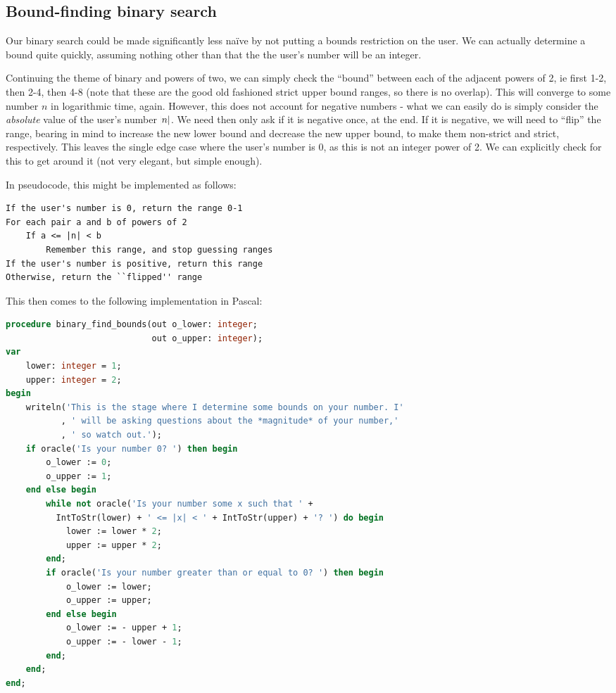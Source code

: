 \documentclass{article}
\begin{document}
    \subsection{Bound-finding binary search}

    Our binary search could be made significantly less na\"ive by not putting a
    bounds restriction on the user. We can actually determine a bound quite
    quickly, assuming nothing other than that the the user's number will be an
    integer.
    
    Continuing the theme of binary and powers of two, we can simply check the
    ``bound'' between each of the adjacent powers of 2, ie first 1-2, then 2-4,
    then 4-8 (note that these are the good old fashioned strict upper bound
    ranges, so there is no overlap). This will converge to some number $n$ in
    logarithmic time, again. However, this does not account for negative
    numbers - what we can easily do is simply consider the \textit{absolute}
    value of the user's number $\abs{n}$. We need then only ask if it is
    negative once, at the end. If it is negative, we will need to ``flip'' the
    range, bearing in mind to increase the new lower bound and decrease the new
    upper bound, to make them non-strict and strict, respectively. This leaves
    the single edge case where the user's number is 0, as this is not an
    integer power of 2. We can explicitly check for this to get around it (not
    very elegant, but simple enough).

    In pseudocode, this might be implemented as follows:

\begin{lstlisting}[caption=Bound-finding pseudocode]
If the user's number is 0, return the range 0-1
For each pair a and b of powers of 2
    If a <= |n| < b
        Remember this range, and stop guessing ranges
If the user's number is positive, return this range
Otherwise, return the ``flipped'' range
\end{lstlisting}

    This then comes to the following implementation in Pascal:

\begin{lstlisting}[language=Pascal, caption=Bound-finding subroutine in Pascal]
procedure binary_find_bounds(out o_lower: integer;
                             out o_upper: integer);
var
    lower: integer = 1;
    upper: integer = 2;
begin
    writeln('This is the stage where I determine some bounds on your number. I'
           , ' will be asking questions about the *magnitude* of your number,'
           , ' so watch out.');
    if oracle('Is your number 0? ') then begin
        o_lower := 0;
        o_upper := 1;
    end else begin
        while not oracle('Is your number some x such that ' +
          IntToStr(lower) + ' <= |x| < ' + IntToStr(upper) + '? ') do begin
            lower := lower * 2;
            upper := upper * 2;
        end;
        if oracle('Is your number greater than or equal to 0? ') then begin
            o_lower := lower;
            o_upper := upper;
        end else begin
            o_lower := - upper + 1;
            o_upper := - lower - 1;
        end;
    end;
end;
\end{lstlisting}
\end{document}

